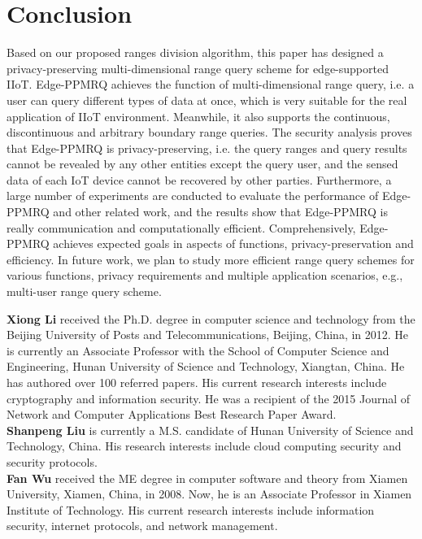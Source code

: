 \documentclass[IEEE JOURNAL OF BIOMEDICAL AND HEALTH INFORMATICS]{IEEEtran}
\begin{document}
 

\section{Conclusion}
 Based on our proposed ranges division algorithm, this paper has designed a privacy-preserving multi-dimensional range query scheme for edge-supported IIoT. Edge-PPMRQ achieves the function of multi-dimensional range query, i.e. a user can query different types of data at once, which is very suitable for the real application of IIoT environment. Meanwhile, it also supports the continuous, discontinuous and arbitrary boundary range queries. The security analysis proves that Edge-PPMRQ is privacy-preserving, i.e. the query ranges and query results cannot be revealed by any other entities except the query user, and the sensed data of each IoT device cannot be recovered by other parties. Furthermore, a large number of experiments are conducted to evaluate the performance of Edge-PPMRQ and other related work, and the results show that Edge-PPMRQ is really communication and computationally efficient. Comprehensively, Edge-PPMRQ achieves expected goals in aspects of functions, privacy-preservation and efficiency. In future work, we plan to study more efficient range query schemes for various functions, privacy requirements and multiple application scenarios, e.g., multi-user range query scheme.

\footnotesize


\vspace{12 pt}
\normalsize

\iffalse
\noindent\textbf{Xiong Li} received the Ph.D. degree in computer science and technology from the Beijing University of Posts and Telecommunications, Beijing, China, in 2012. He is currently an Associate Professor with the School of Computer Science and Engineering, Hunan University of Science and Technology, Xiangtan, China. He has authored over 100 referred papers. His current research interests include cryptography and information security. He was a recipient of the 2015 Journal of Network and Computer Applications Best Research Paper Award.\\

\noindent\textbf{Shanpeng Liu}
 is currently a M.S. candidate of Hunan University of Science and Technology, China. His research interests include cloud computing security and security protocols.\\

\noindent\textbf{Fan Wu} received the ME degree in computer software and theory from Xiamen University, Xiamen, China, in 2008. Now, he is an Associate Professor in Xiamen Institute of Technology. His current research interests include information security, internet protocols, and network management.\\
\end{document}
